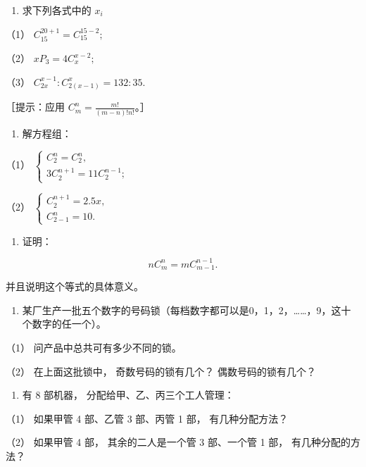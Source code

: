 \begin{enumerate}[start=2]
\item
  求下列各式中的 \(x_{i}\)
\end{enumerate}

（1） \(C_{15}^{20 + 1} = C_{15}^{15 - 2};\)

（2） \(xP_{3} = 4C_{x}^{x - 2};\)

（3） \(C_{2x}^{x-1}: C_{2(x-1)}^{x} = 132:35.\)

［提示：应用 \(C_{m}^{n} = \frac{m!}{(m - n)!n!}\)。］

\begin{enumerate}[start=3]
\item
  解方程组：
\end{enumerate}

（1）
\(\left\{ \begin{array}{l} C_{2}^{n} = C_{2}^{n}, \\ 3C_{2}^{n+1} = 11C_{2}^{n-1}; \end{array} \right.\)

（2）
\(\left\{ \begin{array}{l} C_{2}^{n+1} = 2.5x, \\ C_{2-1}^{n} = 10. \end{array} \right.\)

\begin{enumerate}[start=4]
\item
  证明：
\end{enumerate}

\[
n C _ {m} ^ {n} = m C _ {m - 1} ^ {n - 1}.
\]

并且说明这个等式的具体意义。

\begin{enumerate}[start=5]
\item
  某厂生产一批五个数字的号码锁（每档数字都可以是0，1，2，\ldots\ldots，9，这十个数字的任一个）。
\end{enumerate}

（1） 问产品中总共可有多少不同的锁。

（2） 在上面这批锁中， 奇数号码的锁有几个？ 偶数号码的锁有几个？

\begin{enumerate}[start=6]
\item
  有 8 部机器， 分配给甲、乙、丙三个工人管理：
\end{enumerate}

（1） 如果甲管 4 部、乙管 3 部、丙管 1 部， 有几种分配方法？

（2） 如果甲管 4 部， 其余的二人是一个管 3 部、一个管 1 部，
有几种分配的方法？

